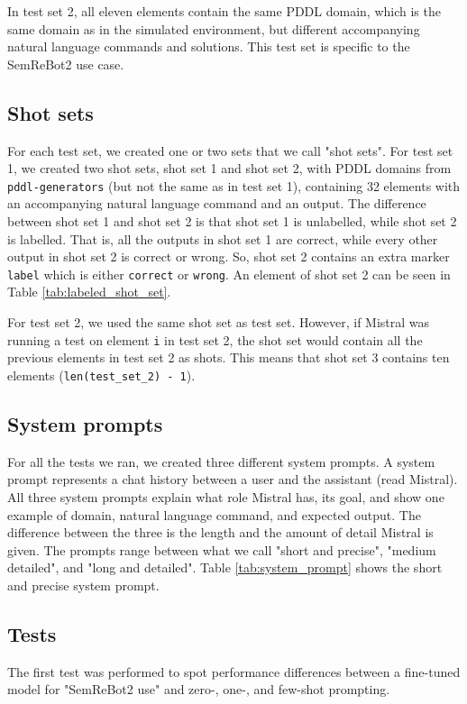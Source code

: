 In test set 2, all eleven elements contain the same PDDL domain, which is the same domain as in the simulated environment, but different accompanying natural language commands and solutions. This test set is specific to the SemReBot2 use case.

\subsection{Shot sets}
For each test set, we created one or two sets that we call "shot sets". For test set 1, we created two shot sets, shot set 1 and shot set 2, with PDDL domains from \verb|pddl-generators| (but not the same as in test set 1), containing 32 elements with an accompanying natural language command and an output. The difference between shot set 1 and shot set 2 is that shot set 1 is unlabelled, while shot set 2 is labelled. That is, all the outputs in shot set 1 are correct, while every other output in shot set 2 is correct or wrong. So, shot set 2 contains an extra marker \verb|label| which is either \verb|correct| or \verb|wrong|. An element of shot set 2 can be seen in Table \ref{tab:labeled_shot_set}.

For test set 2, we used the same shot set as test set. However, if Mistral was running a test on element \verb|i| in test set 2, the shot set would contain all the previous elements in test set 2 as shots. This means that shot set 3 contains ten elements (\verb|len(test_set_2) - 1|).

\subsection{System prompts}\label{ssec:system_prompt}
For all the tests we ran, we created three different system prompts. A system prompt represents a chat history between a user and the assistant (read Mistral). All three system prompts explain what role Mistral has, its goal, and show one example of domain, natural language command, and expected output. The difference between the three is the length and the amount of detail Mistral is given. The prompts range between what we call "short and precise", "medium detailed", and "long and detailed". Table \ref{tab:system_prompt} shows the short and precise system prompt.

\subsection{Tests}
The first test was performed to spot performance differences between a fine-tuned model for "SemReBot2 use" and zero-, one-, and few-shot prompting.

